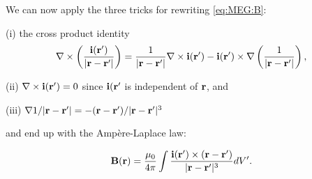 {We can now apply the three tricks for rewriting \eqref{eq:MEG:B}:

(i) the cross product identity
\begin{equation*}
{\bf \nabla} \times \left(\frac{{\bf i}({\bf r}')}{|{\bf r} - {\bf r}'|}\right) = \frac{1}{|{\bf r} - {\bf r}'|} {\bf \nabla} \times {\bf i}({\bf r}') - {\bf i}({\bf r}') \times {\bf \nabla} \left(\frac{1}{|{\bf r} - {\bf r}'|}\right),
\end{equation*}

(ii) ${\bf \nabla} \times {\bf i}({\bf r}') = 0$ since ${\bf i}({\bf r}'$ is independent of ${\bf r}$, and 

(iii) ${\bf \nabla} 1/|{\bf r} - {\bf r}'| = -({\bf r} - {\bf r}')/|{\bf r} - {\bf r}'|^3$

and end up with the Amp\`ere-Laplace law:

\begin{equation}\label{eq:MEG:ampere-laplace}
{\bf B}({\bf r}) = \frac{\mu_0}{4\pi} \int \frac{ {\bf i}({\bf r}') \times ({\bf r} - {\bf r}')}{|{\bf r} - {\bf r}'|^3} dV'.
\end{equation}
}

